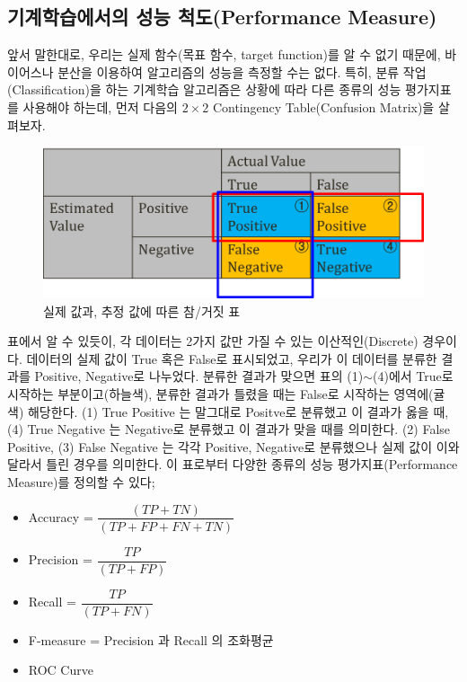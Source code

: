 \documentclass[a4paper]{oblivoir}
\begin{document}
\subsection{기계학습에서의 성능 척도(Performance Measure)}
앞서 말한대로, 우리는 실제 함수(목표 함수, target function)를 알 수 없기 때문에, 바이어스나 분산을 이용하여 알고리즘의 성능을 측정할 수는 없다. 특히, 분류 작업(Classification)을 하는 기계학습 알고리즘은 상황에 따라 다른 종류의 성능 평가지표를 사용해야 하는데, 먼저 다음의 $2 \times 2$ Contingency Table(Confusion Matrix)을 살펴보자.
\begin{figure}[ht]
\centering
\includegraphics[scale=0.65]{Contingency_Table.png}
\caption{실제 값과, 추정 값에 따른 참/거짓 표}
\label{Figure 6-7}
\end{figure}

\indent 표에서 알 수 있듯이, 각 데이터는 2가지 값만 가질 수 있는 이산적인(Discrete) 경우이다. 데이터의 실제 값이 True 혹은 False로 표시되었고, 우리가 이 데이터를 분류한 결과를 Positive, Negative로 나누었다. 분류한 결과가 맞으면 표의 (1)$\sim$(4)에서 True로 시작하는 부분이고(하늘색), 분류한 결과가 틀렸을 때는 False로 시작하는 영역에(귤색) 해당한다. (1) True Positive 는 말그대로 Positve로 분류했고 이 결과가 옳을 때, (4) True Negative 는 Negative로 분류했고 이 결과가 맞을 때를 의미한다. (2) False Positive, (3) False Negative 는 각각 Positive, Negative로 분류했으나 실제 값이 이와 달라서 틀린 경우를 의미한다. 이 표로부터 다양한 종류의 성능 평가지표(Performance Measure)를 정의할 수 있다;
\begin{itemize}
\item Accuracy = $\dfrac{(TP + TN)}{(TP + FP + FN + TN)}$
\item Precision = $\dfrac{TP}{(TP + FP)}$
\item Recall = $\dfrac{TP}{(TP + FN)}$
\item F-measure = Precision 과 Recall 의 조화평균
\item ROC Curve
\end{itemize}
\end{document}
